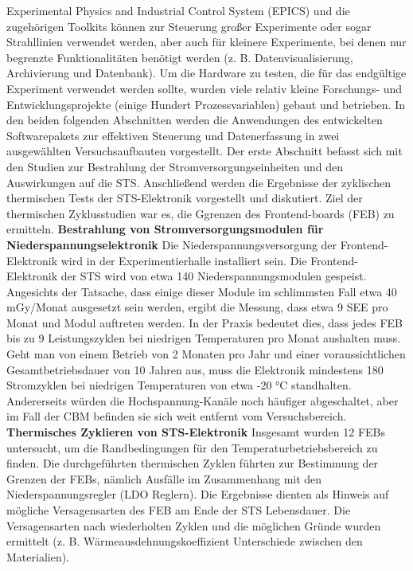 Experimental Physics and Industrial Control System (EPICS) und die zugehörigen Toolkits können zur Steuerung großer Experimente oder sogar Strahllinien verwendet werden, aber auch für kleinere Experimente, bei denen nur begrenzte Funktionalitäten benötigt werden (z. B. Datenvisualisierung, Archivierung und Datenbank). Um die Hardware zu testen, die für das endgültige Experiment verwendet werden sollte, wurden viele relativ kleine Forschungs- und Entwicklungsprojekte (einige Hundert Prozessvariablen) gebaut und betrieben. In den beiden folgenden Abschnitten werden die Anwendungen des entwickelten Softwarepakets zur effektiven Steuerung und Datenerfassung in zwei ausgewählten Versuchsaufbauten vorgestellt. Der erste Abschnitt befasst sich mit den Studien zur Bestrahlung der Stromversorgungseinheiten und den Auswirkungen auf die \gls{STS}. Anschließend werden die Ergebnisse der zyklischen thermischen Tests der \gls{STS}-Elektronik vorgestellt und diskutiert. Ziel der thermischen Zyklusstudien war es, die Ggrenzen des Frontend-boards (FEB) zu ermitteln.
\bigbreak
\textbf{Bestrahlung von Stromversorgungsmodulen für Niederspannungselektronik}
\bigbreak
Die Niederspannungsversorgung der Frontend-Elektronik wird in der Experimentierhalle installiert sein. Die Frontend-Elektronik der \gls{STS} wird von etwa 140 Niederspannungsmodulen gespeist. Angesichts der Tatsache, dass einige dieser Module im schlimmsten Fall etwa 40\,mGy/Monat ausgesetzt sein werden, ergibt die Messung, dass etwa 9 SEE pro Monat und Modul auftreten werden. In der Praxis bedeutet dies, dass jedes FEB bis zu 9 Leistungszyklen bei niedrigen Temperaturen pro Monat aushalten muss. Geht man von einem Betrieb von 2 Monaten pro Jahr und einer voraussichtlichen Gesamtbetriebsdauer von 10 Jahren aus, muss die Elektronik mindestens 180 Stromzyklen bei niedrigen Temperaturen von etwa -20 °C standhalten. Andererseits würden die Hochspannung-Kanäle noch häufiger abgeschaltet, aber im Fall der \gls{CBM} befinden sie sich weit entfernt vom Versuchsbereich.
\bigbreak
\textbf{Thermisches Zyklieren von \gls{STS}-Elektronik}
\bigbreak
Insgesamt wurden 12 FEBs untersucht, um die Randbedingungen für den Temperaturbetriebsbereich zu finden. Die durchgeführten thermischen Zyklen führten zur Bestimmung der Grenzen der FEBs, nämlich Ausfälle im Zusammenhang mit den Niederspannungsregler (LDO Reglern). Die Ergebnisse dienten als Hinweis auf mögliche Versagensarten des \gls{FEB} am Ende der \gls{STS} Lebensdauer. Die Versagensarten nach wiederholten Zyklen und die möglichen Gründe wurden ermittelt (z. B. Wärmeausdehnungskoeffizient Unterschiede zwischen den Materialien). 


